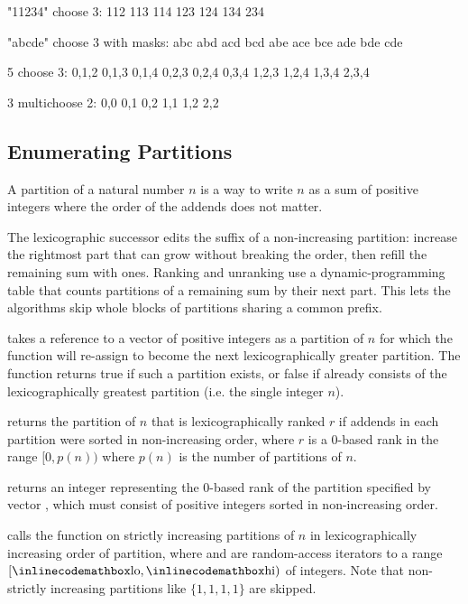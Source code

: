 \begin{exampleoutput}
"11234" choose 3:
112 113 114 123 124 134 234

"abcde" choose 3 with masks:
abc abd acd bcd abe ace bce ade bde cde

5 choose 3:
{0,1,2} {0,1,3} {0,1,4} {0,2,3} {0,2,4} {0,3,4} {1,2,3} {1,2,4} {1,3,4} {2,3,4}

3 multichoose 2:
{0,0} {0,1} {0,2} {1,1} {1,2} {2,2}
\end{exampleoutput}
\subsection{Enumerating Partitions}
\label{sec:6.2.5}
A partition of a natural number $n$ is a way to write $n$ as a sum of positive integers where the order of the addends does not matter.

The lexicographic successor edits the suffix of a non-increasing partition: increase the rightmost part that can grow without breaking the order, then refill the remaining sum with ones. Ranking and unranking use a dynamic-programming table that counts partitions of a remaining sum by their next part. This lets the algorithms skip whole blocks of partitions sharing a common prefix.

\begin{compactitem}
  \item {} takes a reference to a vector  of positive integers as a partition of $n$ for which the function will re-assign to become the next lexicographically greater partition. The function returns true if such a partition exists, or false if  already consists of the lexicographically greatest partition (i.e. the single integer $n$).
  \item {} returns the partition of $n$ that is lexicographically ranked $r$ if addends in each partition were sorted in non-increasing order, where $r$ is a 0-based rank in the range $[0, p(n))$ where $p(n)$ is the number of partitions of $n$.
  \item {} returns an integer representing the 0-based rank of the partition specified by vector , which must consist of positive integers sorted in non-increasing order.
  \item {} calls the function  on strictly increasing partitions of $n$ in lexicographically increasing order of partition, where  and  are random-access iterators to a range $[{\inlinecodemath{lo}}, {\inlinecodemath{hi}})$ of integers. Note that non-strictly increasing partitions like $\{1, 1, 1, 1\}$ are skipped.
\end{compactitem}


